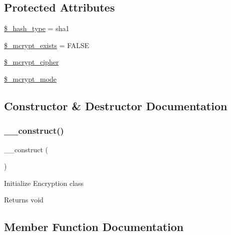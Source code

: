 \subsection*{Protected Attributes}
\begin{DoxyCompactItemize}
\item 
\mbox{\hyperlink{class_c_i___encrypt_a04e9d4ea0e45fc04c07aa1e291e17412}{\$\+\_\+hash\+\_\+type}} = \textquotesingle{}sha1\textquotesingle{}
\item 
\mbox{\hyperlink{class_c_i___encrypt_aaf4246798dad057cc4e294706e5e4e37}{\$\+\_\+mcrypt\+\_\+exists}} = F\+A\+L\+SE
\item 
\mbox{\hyperlink{class_c_i___encrypt_ab2cdedd99c4818b191c667f5e081a2db}{\$\+\_\+mcrypt\+\_\+cipher}}
\item 
\mbox{\hyperlink{class_c_i___encrypt_ace4d98b5320c7fe75e6a38505abcdb82}{\$\+\_\+mcrypt\+\_\+mode}}
\end{DoxyCompactItemize}


\subsection{Constructor \& Destructor Documentation}
\mbox{\label{class_c_i___encrypt_a095c5d389db211932136b53f25f39685}} 
\subsubsection{\texorpdfstring{\+\_\+\+\_\+construct()}{\_\_construct()}}
{\footnotesize\ttfamily \+\_\+\+\_\+construct (\begin{DoxyParamCaption}{ }\end{DoxyParamCaption})}

Initialize Encryption class

\begin{DoxyReturn}{Returns}
void 
\end{DoxyReturn}


\subsection{Member Function Documentation}
\mbox{\label{class_c_i___encrypt_ada423e99876a54e7bc33afc9899d01a2}} 
